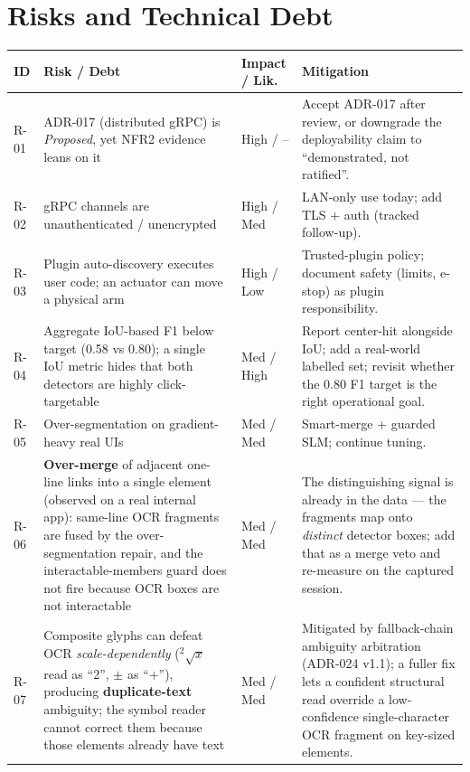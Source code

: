 \documentclass[11pt,a4paper]{report}
\newcommand{\code}[1]{\texttt{#1}}
\begin{document}
\chapter{Risks and Technical Debt}
\begin{longtable}{@{}p{1.2cm}p{5.0cm}p{2.0cm}p{5.6cm}@{}}
\toprule
\textbf{ID} & \textbf{Risk / Debt} & \textbf{Impact / Lik.} & \textbf{Mitigation} \\
\midrule
\endhead
R-01 & ADR-017 (distributed gRPC) is \emph{Proposed}, yet NFR2 evidence leans on it & High / -- & Accept ADR-017 after review, or downgrade the deployability claim to ``demonstrated, not ratified''. \\
R-02 & gRPC channels are unauthenticated / unencrypted & High / Med & LAN-only use today; add TLS + auth (tracked follow-up). \\
R-03 & Plugin auto-discovery executes user code; an actuator can move a physical arm & High / Low & Trusted-plugin policy; document safety (limits, e-stop) as plugin responsibility. \\
R-04 & Aggregate IoU-based F1 below target (0.58 vs 0.80); a single IoU metric hides that both detectors are highly click-targetable & Med / High & Report center-hit alongside IoU; add a real-world labelled set; revisit whether the 0.80 F1 target is the right operational goal. \\
R-05 & Over-segmentation on gradient-heavy real UIs & Med / Med & Smart-merge + guarded SLM; continue tuning. \\
R-06 & \textbf{Over-merge} of adjacent one-line links into a single element (observed on a real internal app): same-line OCR fragments are fused by the over-segmentation repair, and the interactable-members guard does not fire because OCR boxes are not interactable & Med / Med & The distinguishing signal is already in the data --- the fragments map onto \emph{distinct} detector boxes; add that as a merge veto and re-measure on the captured session. \\
R-07 & Composite glyphs can defeat OCR \emph{scale-dependently} (\code{$^2\sqrt{x}$} read as ``2'', \code{$\pm$} as ``+''), producing \textbf{duplicate-text} ambiguity; the symbol reader cannot correct them because those elements already have text & Med / Med & Mitigated by fallback-chain ambiguity arbitration (ADR-024 v1.1); a fuller fix lets a confident structural read override a low-confidence single-character OCR fragment on key-sized elements. \\

\end{longtable}
\end{document}

